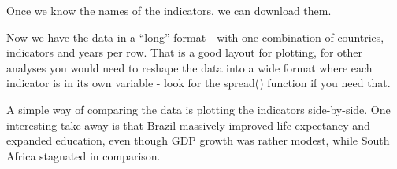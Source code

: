\documentclass[
]{book}
\newenvironment{Shaded}{\begin{snugshade}}{\end{snugshade}}
\newcommand{\CommentTok}[1]{\textcolor[rgb]{0.56,0.35,0.01}{\textit{#1}}}
\newcommand{\DataTypeTok}[1]{\textcolor[rgb]{0.13,0.29,0.53}{#1}}
\newcommand{\KeywordTok}[1]{\textcolor[rgb]{0.13,0.29,0.53}{\textbf{#1}}}
\newcommand{\NormalTok}[1]{#1}
\newcommand{\OtherTok}[1]{\textcolor[rgb]{0.56,0.35,0.01}{#1}}
\newcommand{\StringTok}[1]{\textcolor[rgb]{0.31,0.60,0.02}{#1}}
\begin{document}
Once we know the names of the indicators, we can download them.

\begin{Shaded}
\end{Shaded}

Now we have the data in a ``long'' format - with one combination of countries, indicators and years per row. That is a good layout for plotting, for other analyses you would need to reshape the data into a wide format where each indicator is in its own variable - look for the spread() function if you need that.

A simple way of comparing the data is plotting the indicators side-by-side. One interesting take-away is that Brazil massively improved life expectancy and expanded education, even though GDP growth was rather modest, while South Africa stagnated in comparison.
\end{document}
